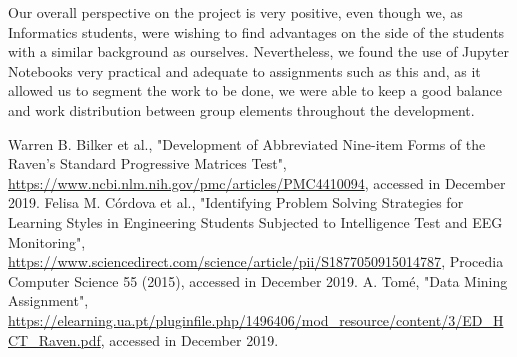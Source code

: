 \documentclass[extendedabs]{recpad2k}
\begin{document}
Our overall perspective on the project is very positive, even though we, as Informatics students, were wishing to find advantages on the side of the 
students with a similar background as ourselves.
Nevertheless, we found the use of Jupyter Notebooks very practical and adequate to assignments such as this and, as it allowed us to segment the work to be done,
we were able to keep a good balance and work distribution between group elements throughout the development.







\begin{thebibliography}{00}
 Warren B. Bilker et al., "Development of Abbreviated Nine-item Forms of the Raven’s Standard Progressive Matrices Test", \url{https://www.ncbi.nlm.nih.gov/pmc/articles/PMC4410094}, accessed in December 2019.
 Felisa M. Córdova et al., "Identifying Problem Solving Strategies for Learning Styles in Engineering Students Subjected to Intelligence Test and EEG Monitoring", \url{https://www.sciencedirect.com/science/article/pii/S1877050915014787}, Procedia Computer Science 55 (2015), accessed in December 2019.
 A. Tomé, "Data Mining Assignment", \url{https://elearning.ua.pt/pluginfile.php/1496406/mod_resource/content/3/ED_HCT_Raven.pdf}, accessed in December 2019.

\end{thebibliography}
\end{document}

